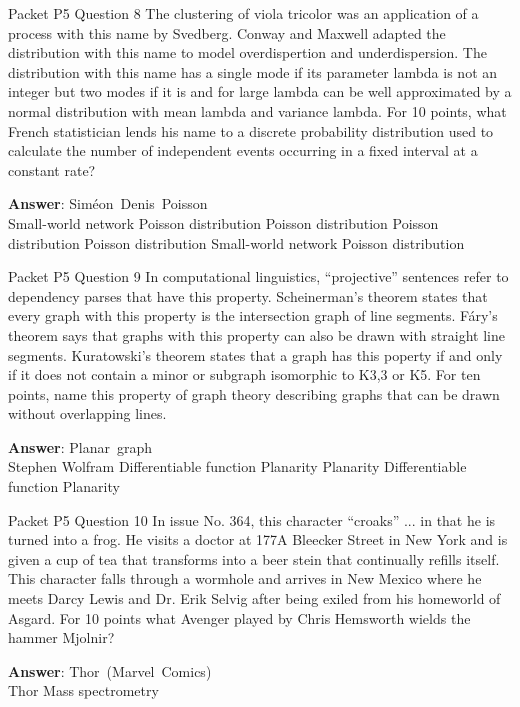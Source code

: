 \begin{frame}{Packet P5 Question 8}
The clustering of viola   tricolor was an application of a process with this name by Svedberg. Conway and Maxwell adapted the distribution with this name to model overdispertion and underdispersion. The distribution with this name has a single mode if its parameter lambda is not an integer but two modes   if it is and for large lambda can be well approximated by a normal distribution with mean lambda and variance lambda.    For 10 points, what French statistician lends his name to a discrete probability distribution used to calculate the number of independent events occurring in a fixed interval at a constant rate?        

\textbf{Answer}: Siméon\ Denis\ Poisson\\
 Small-world network
 Poisson distribution
 Poisson distribution
 Poisson distribution
 Poisson distribution
 Small-world network
 Poisson distribution
\end{frame}

\begin{frame}{Packet P5 Question 9}
In computational linguistics,   ``projective'' sentences refer to dependency parses that have this property.  Scheinerman's theorem states that every graph with this property is the intersection graph of line   segments.  Fáry's theorem says that graphs with this property can also be drawn with straight line   segments.  Kuratowski's theorem states that a graph has this poperty if and only if it does not contain a minor or subgraph isomorphic to K3,3 or K5.  For ten points, name this property of graph theory describing graphs that can be drawn   without overlapping lines.       

\textbf{Answer}: Planar\ graph\\
 Stephen Wolfram
 Differentiable function
 Planarity
 Planarity
 Differentiable function
 Planarity
\end{frame}

\begin{frame}{Packet P5 Question 10}
In issue No. 364, this character ``croaks'' ... in that he is turned into a frog. He visits a doctor at 177A Bleecker Street in New York and is given a cup of tea that transforms into a beer stein that continually refills itself. This character falls through a wormhole and arrives in New Mexico where he meets Darcy Lewis and Dr. Erik Selvig after being exiled from his homeworld of Asgard. For 10 points what Avenger played by Chris Hemsworth wields the hammer Mjolnir?        

\textbf{Answer}: Thor\ (Marvel\ Comics)\\
 Thor
 Mass spectrometry
\end{frame}

